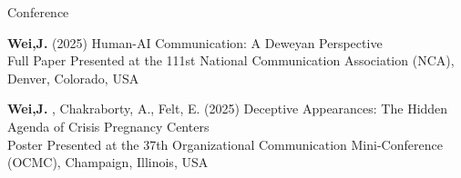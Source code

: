 \documentclass[
	11pt, %
]{resume} %
\begin{document}
\begin{rSection}{Conference}

    
	\textbf{Wei,J.} (2025) Human-AI Communication: A Deweyan Perspective\\
\textbullet\enspace Full Paper Presented at the 111st National Communication Association (NCA), Denver, Colorado, USA

	\textbf{Wei,J.} , Chakraborty, A., Felt, E. (2025) Deceptive Appearances: The Hidden Agenda of Crisis Pregnancy Centers \\
\textbullet\enspace Poster Presented at the 37th Organizational Communication Mini-Conference (OCMC), Champaign, Illinois, USA
	
\end{rSection}


\end{document}
